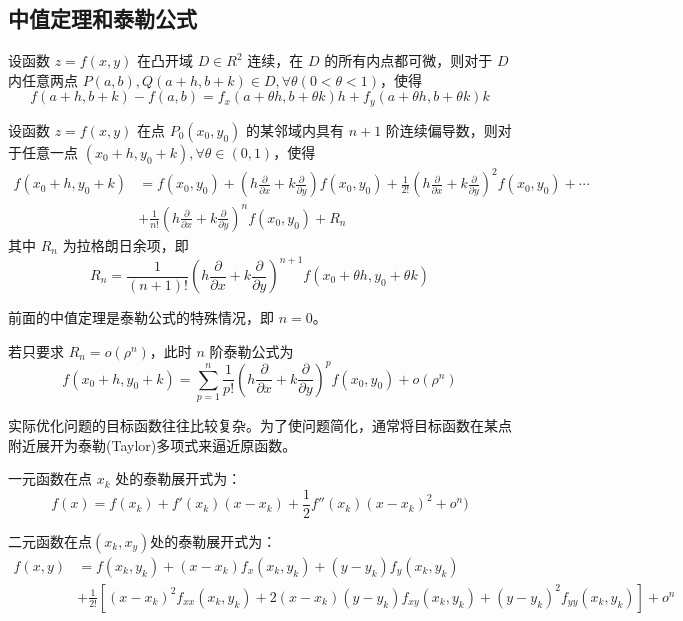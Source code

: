 \subsection{中值定理和泰勒公式}

\begin{theorem}[拉格朗日中值定理]
    设函数 $z=f(x,y)$ 在凸开域 $D\in R^2$ 连续，在 $D$ 的所有内点都可微，则对于 $D$ 内任意两点 $P(a,b),Q(a+h,b+k)\in D, \forall\theta(0<\theta<1)$，使得
    \[
        f(a+h,b+k)-f(a,b)=f_x(a+\theta h,b+\theta k)h+f_y(a+\theta h,b+\theta k)k
    \]
\end{theorem}

\begin{theorem}[泰勒公式]
    设函数 $z=f(x,y)$ 在点 $P_0(x_0,y_0)$ 的某邻域内具有 $n+1$ 阶连续偏导数，则对于任意一点 $(x_0+h,y_0+k),\forall \theta \in (0,1)$，使得
    \[
        \begin{aligned}
            f(x_0+h,y_0+k) & =f(x_0,y_0)+(h\frac{\partial}{\partial x}+k\frac{\partial}{\partial y})f(x_0,y_0)+\frac{1}{2!}(h\frac{\partial}{\partial x}+k\frac{\partial}{\partial y})^2f(x_0,y_0)+\cdots \\
                           & +\frac{1}{n!}(h\frac{\partial}{\partial x}+k\frac{\partial}{\partial y})^nf(x_0,y_0)+R_n
        \end{aligned}
    \]
    其中 $R_n$ 为拉格朗日余项，即
    \[
        R_n=\frac{1}{(n+1)!}(h\frac{\partial}{\partial x}+k\frac{\partial}{\partial y})^{n+1}f(x_0+\theta h,y_0+\theta k)
    \]
\end{theorem}

前面的中值定理是泰勒公式的特殊情况，即 $n=0$。

若只要求 $R_n=o(\rho^n)$，此时 $n$ 阶泰勒公式为
\[
    f(x_0+h,y_0+k)=\sum_{p=1}^n\frac{1}{p!}(h\frac{\partial}{\partial x}+k\frac{\partial}{\partial y})^pf(x_0,y_0)+o(\rho^n)
\]

实际优化问题的目标函数往往比较复杂。为了使问题简化，通常将目标函数在某点附近展开为泰勒(Taylor)多项式来逼近原函数。

一元函数在点 $x_k$ 处的泰勒展开式为：
\[
    f(x)=f(x_k)+f'(x_k)(x-x_k)+\frac{1}{2}f''(x_k)(x-x_k)^2+o^n)
\]

二元函数在点$(x_k,x_y)$处的泰勒展开式为：
\[
    \begin{aligned}
        f(x,y) & =f(x_k,y_k)+(x-x_k)f_x(x_k,y_k)+(y-y_k)f_y(x_k,y_k)                                                 \\
               & +\frac{1}{2!}[(x-x_k)^2f_{xx}(x_k,y_k)+2(x-x_k)(y-y_k)f_{xy}(x_k,y_k)+(y-y_k)^2f_{yy}(x_k,y_k)]+o^n
    \end{aligned}
\]
